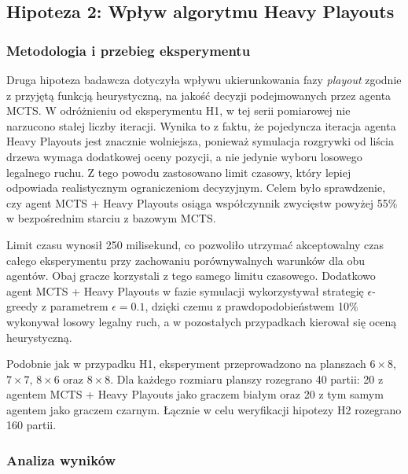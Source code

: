 \documentclass{article}
\begin{document}
\newpage
\subsection{Hipoteza 2: Wpływ algorytmu Heavy Playouts}

\subsubsection{Metodologia i przebieg eksperymentu}

Druga hipoteza badawcza dotyczyła wpływu ukierunkowania fazy \textit{playout} zgodnie z przyjętą funkcją heurystyczną, na jakość decyzji podejmowanych przez agenta MCTS. W odróżnieniu od eksperymentu H1, w tej serii pomiarowej nie narzucono stałej liczby iteracji. Wynika to z faktu, że pojedyncza iteracja agenta Heavy Playouts jest znacznie wolniejsza, ponieważ symulacja rozgrywki od liścia drzewa wymaga dodatkowej oceny pozycji, a nie jedynie wyboru losowego legalnego ruchu. Z tego powodu zastosowano limit czasowy, który lepiej odpowiada realistycznym ograniczeniom decyzyjnym. Celem było sprawdzenie, czy agent MCTS + Heavy Playouts osiąga współczynnik zwycięstw powyżej 55\% w bezpośrednim starciu z bazowym MCTS.

Limit czasu wynosił 250 milisekund, co pozwoliło utrzymać akceptowalny czas całego eksperymentu przy zachowaniu porównywalnych warunków dla obu agentów. Obaj gracze korzystali z tego samego limitu czasowego. Dodatkowo agent MCTS + Heavy Playouts w fazie symulacji wykorzystywał strategię $\epsilon$-greedy z parametrem $\epsilon = 0.1$, dzięki czemu z prawdopodobieństwem 10\% wykonywał losowy legalny ruch, a w pozostałych przypadkach kierował się oceną heurystyczną.

Podobnie jak w przypadku H1, eksperyment przeprowadzono na planszach $6 \times 8$, $7 \times 7$, $8 \times 6$ oraz $8 \times 8$. Dla każdego rozmiaru planszy rozegrano 40 partii: 20 z agentem MCTS + Heavy Playouts jako graczem białym oraz 20 z tym samym agentem jako graczem czarnym. Łącznie w celu weryfikacji hipotezy H2 rozegrano 160 partii.

\subsubsection{Analiza wyników}
\end{document}
